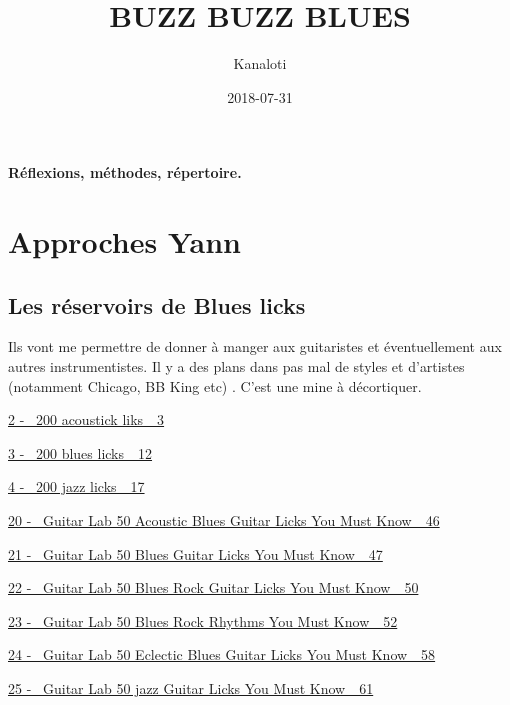 \documentclass[a4paper]{book}
\title{BUZZ BUZZ BLUES}
\author{Kanaloti}
\date{2018-07-31}
\begin{document}
\clearpage\setcounter{page}{1}\pagestyle{LeftPage}
\thispagestyle{RightPage}
{\centering\sffamily\bfseries {\maketitle}}
{\centering\sffamily\bfseries
R\'eflexions, m\'ethodes, r\'epertoire.
\par}




\setcounter{tocdepth}{10}
\renewcommand\contentsname{Table des mati\`eres}
\tableofcontents





\chapter[Approches Yann]{Approches Yann}
\hypertarget{RefHeadingToc502973218262}{}
\section[Les r\'eservoirs de
Blues licks]{Les r\'eservoirs de Blues licks}
\hypertarget{RefHeadingToc2386396532557}{}Ils vont me permettre de
donner \`a manger aux guitaristes et \'eventuellement aux autres
instrumentistes. Il y a des plans dans pas mal de styles et
d{\textquoteright}artistes (notamment Chicago, BB King etc) .
C{\textquoteright}est une mine \`a d\'ecortiquer.

\hyperlink{RefHeadingToc102973218262}{2 - \ 200 acoustick liks\ \ 3}

\hyperlink{RefHeadingToc104973218262}{3 - \ 200 blues licks\ \ 12}

\hyperlink{RefHeadingToc106973218262}{4 - \ 200 jazz licks\ \ 17}

\hyperlink{RefHeadingToc140973218262}{20 - \ Guitar Lab 50 Acoustic
Blues Guitar Licks You Must Know\ \ 46}

\hyperlink{RefHeadingToc142973218262}{21 - \ Guitar Lab 50 Blues Guitar
Licks You Must Know\ \ 47}

\hyperlink{RefHeadingToc144973218262}{22 - \ Guitar Lab 50 Blues Rock
Guitar Licks You Must Know\ \ 50}

\hyperlink{RefHeadingToc146973218262}{23 - \ Guitar Lab 50 Blues Rock
Rhythms You Must Know\ \ 52}

\hyperlink{RefHeadingToc148973218262}{24 - \ Guitar Lab 50 Eclectic
Blues Guitar Licks You Must Know\ \ 58}

\hyperlink{RefHeadingToc150973218262}{25 - \ Guitar Lab 50 jazz Guitar
Licks You Must Know\ \ 61}
\end{document}
